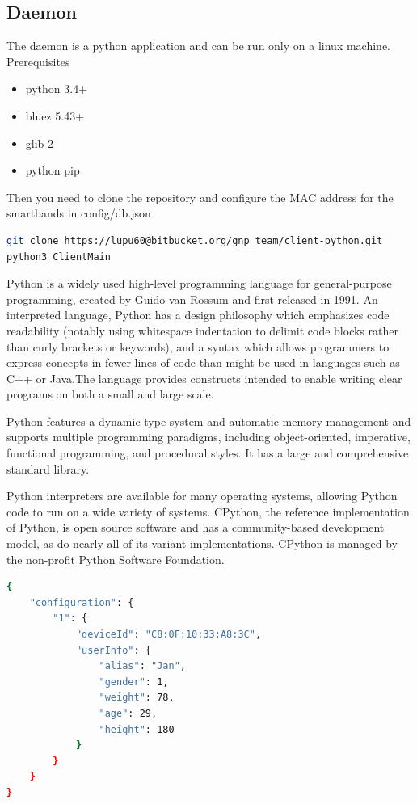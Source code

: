 \subsection{Daemon}
The daemon is a python application and can be run only on a linux machine.
Prerequisites
\begin{itemize}
	\item python 3.4+
    \item bluez 5.43+
	\item glib 2
	\item python pip
\end{itemize}
Then you need to clone the repository and configure the MAC address for the smartbands in config/db.json
\begin{lstlisting}[language=Bash]
git clone https://lupu60@bitbucket.org/gnp_team/client-python.git
python3 ClientMain
\end{lstlisting}
Python is a widely used high-level programming language for general-purpose programming, created by Guido van Rossum and first released in 1991. An interpreted language, Python has a design philosophy which emphasizes code readability (notably using whitespace indentation to delimit code blocks rather than curly brackets or keywords), and a syntax which allows programmers to express concepts in fewer lines of code than might be used in languages such as C++ or Java.The language provides constructs intended to enable writing clear programs on both a small and large scale.
\newline

Python features a dynamic type system and automatic memory management and supports multiple programming paradigms, including object-oriented, imperative, functional programming, and procedural styles. It has a large and comprehensive standard library.
\newline

Python interpreters are available for many operating systems, allowing Python code to run on a wide variety of systems. CPython, the reference implementation of Python, is open source software and has a community-based development model, as do nearly all of its variant implementations. CPython is managed by the non-profit Python Software Foundation.
\begin{lstlisting}[language=Bash]
{
	"configuration": {
		"1": {
			"deviceId": "C8:0F:10:33:A8:3C",
			"userInfo": {
				"alias": "Jan",
				"gender": 1,
				"weight": 78,
				"age": 29,
				"height": 180
			}
		}
	}
}
\end{lstlisting}


